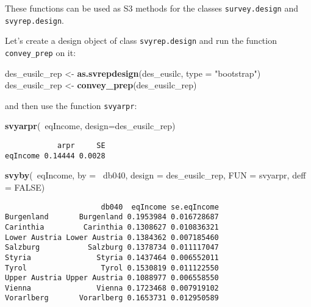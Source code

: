 \documentclass[]{book}
\newenvironment{Shaded}{\begin{snugshade}}{\end{snugshade}}
\newcommand{\KeywordTok}[1]{\textcolor[rgb]{0.13,0.29,0.53}{\textbf{{#1}}}}
\newcommand{\DataTypeTok}[1]{\textcolor[rgb]{0.13,0.29,0.53}{{#1}}}
\newcommand{\StringTok}[1]{\textcolor[rgb]{0.31,0.60,0.02}{{#1}}}
\newcommand{\OtherTok}[1]{\textcolor[rgb]{0.56,0.35,0.01}{{#1}}}
\newcommand{\NormalTok}[1]{{#1}}
\begin{document}
These functions can be used as S3 methods for the classes
\texttt{survey.design} and \texttt{svyrep.design}.

Let's create a design object of class \texttt{svyrep.design} and run the
function \texttt{convey\_prep} on it:

\begin{Shaded}
\begin{Highlighting}[]
\NormalTok{des_eusilc_rep <-}\StringTok{ }\KeywordTok{as.svrepdesign}\NormalTok{(des_eusilc, }\DataTypeTok{type =} \StringTok{"bootstrap"}\NormalTok{)}
\NormalTok{des_eusilc_rep <-}\StringTok{ }\KeywordTok{convey_prep}\NormalTok{(des_eusilc_rep) }
\end{Highlighting}
\end{Shaded}

and then use the function \texttt{svyarpr}:

\begin{Shaded}
\begin{Highlighting}[]
\KeywordTok{svyarpr}\NormalTok{(~eqIncome, }\DataTypeTok{design=}\NormalTok{des_eusilc_rep)}
\end{Highlighting}
\end{Shaded}

\begin{verbatim}
            arpr     SE
eqIncome 0.14444 0.0028
\end{verbatim}

\begin{Shaded}
\begin{Highlighting}[]
\KeywordTok{svyby}\NormalTok{(~eqIncome, }\DataTypeTok{by =} \NormalTok{~db040, }\DataTypeTok{design =} \NormalTok{des_eusilc_rep, }\DataTypeTok{FUN =} \NormalTok{svyarpr, }\DataTypeTok{deff =} \OtherTok{FALSE}\NormalTok{)}
\end{Highlighting}
\end{Shaded}

\begin{verbatim}
                      db040  eqIncome se.eqIncome
Burgenland       Burgenland 0.1953984 0.016728687
Carinthia         Carinthia 0.1308627 0.010836321
Lower Austria Lower Austria 0.1384362 0.007185460
Salzburg           Salzburg 0.1378734 0.011117047
Styria               Styria 0.1437464 0.006552011
Tyrol                 Tyrol 0.1530819 0.011122550
Upper Austria Upper Austria 0.1088977 0.006558550
Vienna               Vienna 0.1723468 0.007919102
Vorarlberg       Vorarlberg 0.1653731 0.012950589
\end{verbatim}
\end{document}
